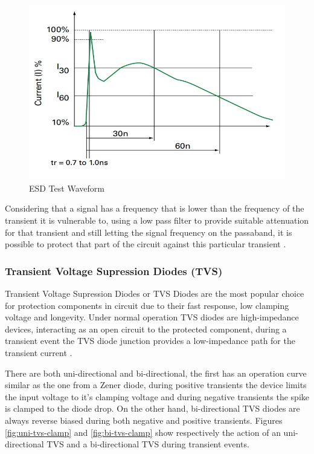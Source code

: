 		\begin{figure}[htbp]
			\centering
			\includegraphics[width=.5\textwidth]{figuras/fig-esd-test-waveform}
			\caption{ESD Test Waveform \cite{esd-test-waveform}}
			\label{fig:esd-test-waveform}
		\end{figure}

		Considering that a signal has a frequency that is lower than the frequency of the transient it is vulnerable to, using a low pass filter to provide suitable attenuation for that transient and still letting the signal frequency on the passaband, it is possible to protect that part of the circuit against this particular transient \cite{standler1988use}. 


	\subsubsection{Transient Voltage Supression Diodes (TVS)}\label{sssec:tvsTransientProtection}

		\label{ssssec:tvsOperation}
			Transient Voltage Supression Diodes or TVS Diodes are the most popular choice for protection components in circuit due to their fast response, low clamping voltage and longevity. Under normal operation TVS diodes are high-impedance devices, interacting as an open circuit to the protected component, during a transient event the TVS diode junction provides a low-impedance path for the transient current \cite{renesasTVS}.
			\par
			There are both uni-directional and bi-directional, the first has an operation curve similar as the one from a Zener diode, during positive transients the device limits the input voltage to it's clamping voltage and during negative transients the spike is clamped to the diode drop. On the other hand, bi-directional TVS diodes are always reverse biased during both negative and positive transients. Figures \ref{fig:uni-tvs-clamp} and \ref{fig:bi-tvs-clamp} show respectively the action of an uni-directional TVS and a bi-directional TVS during transient events.


